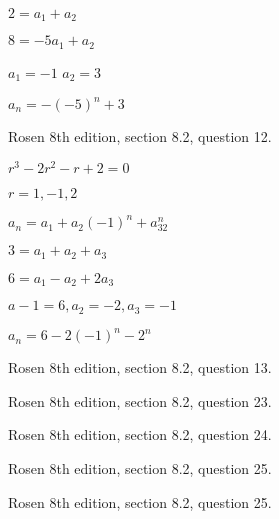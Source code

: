 $2 = a_1 + a_2$

$8= -5a_1 + a_2$

$a_1 = -1$ $a_2 = 3$

$a_n = -(-5)^n + 3$









\newpage
\nextq Rosen 8th edition, section 8.2, question 12.

\SOLUTION

$r^3 -2r^2 - r + 2 =0$

$r = 1,-1,2$

$a_n = a_1 + a_2(-1)^n + a_32^n $

$3 = a_1 + a_2 + a_3$

$ 6 = a_1 - a_2 + 2a_3$

$ a-1 = 6, a_2 = -2, a_3 = -1$

$a_n = 6 - 2(-1)^n - 2^n$





\newpage
\nextq Rosen 8th edition, section 8.2, question 13.

\SOLUTION



\newpage
\nextq Rosen 8th edition, section 8.2, question 23.

\SOLUTION



\newpage
\nextq Rosen 8th edition, section 8.2, question 24.

\SOLUTION



\newpage
\nextq Rosen 8th edition, section 8.2, question 25.

\SOLUTION



\newpage
\nextq Rosen 8th edition, section 8.2, question 25.

\SOLUTION

